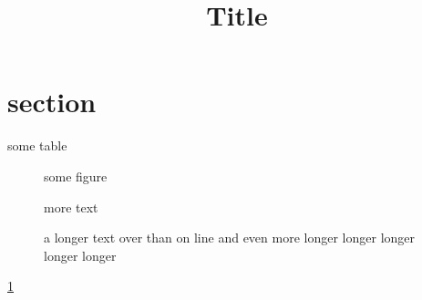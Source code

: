 \documentclass[11pt]{article}
\title{Title}
\begin{document}
\section{section}

\begin{minipage}{4cm}
some table
\end{minipage}

\begin{figure}

some figure

\caption{a longer text over than on line and even more longer
longer longer longer longer}\label{test}

more text
\end{figure}

\ref{test}
\end{document}
